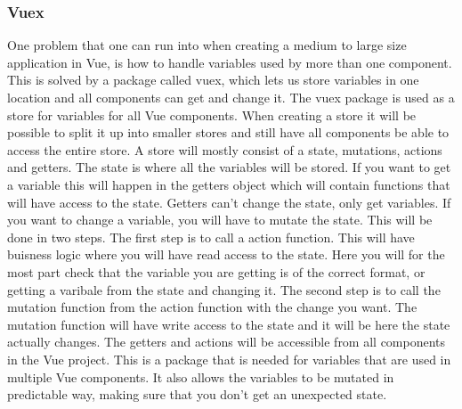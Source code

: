 \subsubsection{Vuex}
One problem that one can run into when creating a medium to large size application in Vue, is how to handle variables used by more than one component. This is solved by a package called vuex\cite{VUEX}, which lets us store variables in one location and all components can get and change it. The vuex package is used as a store for variables for all Vue components. When creating a store it will be possible to split it up into smaller stores and still have all components be able to access the entire store. A store will mostly consist of a state, mutations, actions and getters. The state is where all the variables will be stored. If you want to get a variable this will happen in the getters object which will contain functions that will have access to the state. Getters can't change the state, only get variables. If you want to change a variable, you will have to mutate the state. This will be done in two steps. The first step is to call a action function. This will have buisness logic where you will have read access to the state. Here you will for the most part check that the variable you are getting is of the correct format, or getting a varibale from the state and changing it. The second step is to call the mutation function from the action function with the change you want. The mutation function will have write access to the state and it will be here the state actually changes. The getters and actions will be accessible from all components in the Vue project. This is a package that is needed for variables that are used in multiple Vue components. It also allows the variables to be mutated in predictable way, making sure that you don't get an unexpected state.